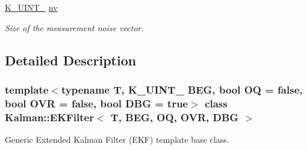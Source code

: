 \begin{Indent}
\begin{DoxyCompactItemize}
\mbox{\label{classKalman_1_1EKFilter_ab839a4708545eac86f62c65be060688e}} 
\mbox{\hyperlink{namespaceKalman_a628a50cae10f6e2035393d4f96c698bd}{K\+\_\+\+U\+I\+N\+T\+\_}} \mbox{\hyperlink{classKalman_1_1EKFilter_ab839a4708545eac86f62c65be060688e}{nv}}
\begin{DoxyCompactList}\small\item\em Size of the measurement noise vector. \end{DoxyCompactList}\end{DoxyCompactItemize}
\end{Indent}


\subsection{Detailed Description}
\subsubsection*{template$<$typename T, K\+\_\+\+U\+I\+N\+T\+\_ B\+EG, bool OQ = false, bool O\+VR = false, bool D\+BG = true$>$\newline
class Kalman\+::\+E\+K\+Filter$<$ T, B\+E\+G, O\+Q, O\+V\+R, D\+B\+G $>$}

Generic Extended Kalman Filter (E\+KF) template base class. 

